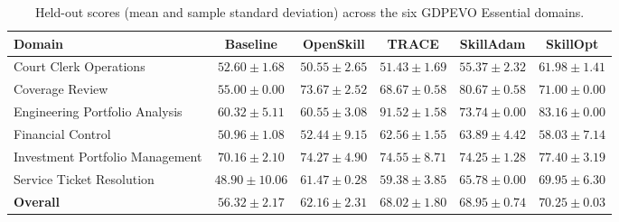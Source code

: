 \begin{table}[t]
  \centering
  \small
  \caption{Held-out scores (mean and sample standard deviation) across the six GDPEVO Essential domains.}
  \label{tab:cross-method-results}
  \begin{tabular*}{\textwidth}{@{\extracolsep{\fill}}lccccc@{}}
    \toprule
    \textbf{Domain} & \textbf{Baseline} & \textbf{OpenSkill} & \textbf{TRACE} & \textbf{SkillAdam} & \textbf{SkillOpt} \\
    \midrule
    Court Clerk Operations & \(52.60 \pm 1.68\) & \(50.55 \pm 2.65\) & \(51.43 \pm 1.69\) & \(55.37 \pm 2.32\) & \textbf{\boldmath \(61.98 \pm 1.41\)} \\
    Coverage Review & \(55.00 \pm 0.00\) & \(73.67 \pm 2.52\) & \(68.67 \pm 0.58\) & \textbf{\boldmath \(80.67 \pm 0.58\)} & \(71.00 \pm 0.00\) \\
    Engineering Portfolio Analysis & \(60.32 \pm 5.11\) & \(60.55 \pm 3.08\) & \textbf{\boldmath \(91.52 \pm 1.58\)} & \(73.74 \pm 0.00\) & \(83.16 \pm 0.00\) \\
    Financial Control & \(50.96 \pm 1.08\) & \(52.44 \pm 9.15\) & \(62.56 \pm 1.55\) & \textbf{\boldmath \(63.89 \pm 4.42\)} & \(58.03 \pm 7.14\) \\
    Investment Portfolio Management & \(70.16 \pm 2.10\) & \(74.27 \pm 4.90\) & \(74.55 \pm 8.71\) & \(74.25 \pm 1.28\) & \textbf{\boldmath \(77.40 \pm 3.19\)} \\
    Service Ticket Resolution & \(48.90 \pm 10.06\) & \(61.47 \pm 0.28\) & \(59.38 \pm 3.85\) & \(65.78 \pm 0.00\) & \textbf{\boldmath \(69.95 \pm 6.30\)} \\
    \midrule
    \textbf{Overall} & \(56.32 \pm 2.17\) & \(62.16 \pm 2.31\) & \(68.02 \pm 1.80\) & \(68.95 \pm 0.74\) & \textbf{\boldmath \(70.25 \pm 0.03\)} \\
    \bottomrule
  \end{tabular*}
\end{table}
